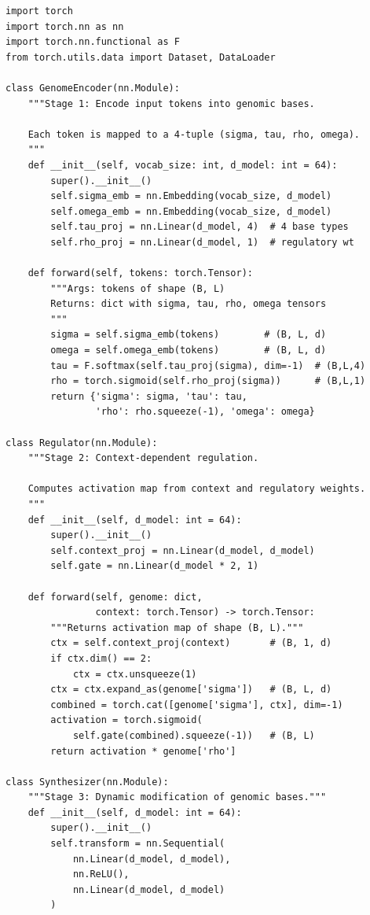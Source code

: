 \begin{lstlisting}[style=dogmapython, caption={Lab 6: DOGMA pipeline stages as PyTorch modules.}]
import torch
import torch.nn as nn
import torch.nn.functional as F
from torch.utils.data import Dataset, DataLoader

class GenomeEncoder(nn.Module):
    """Stage 1: Encode input tokens into genomic bases.

    Each token is mapped to a 4-tuple (sigma, tau, rho, omega).
    """
    def __init__(self, vocab_size: int, d_model: int = 64):
        super().__init__()
        self.sigma_emb = nn.Embedding(vocab_size, d_model)
        self.omega_emb = nn.Embedding(vocab_size, d_model)
        self.tau_proj = nn.Linear(d_model, 4)  # 4 base types
        self.rho_proj = nn.Linear(d_model, 1)  # regulatory wt

    def forward(self, tokens: torch.Tensor):
        """Args: tokens of shape (B, L)
        Returns: dict with sigma, tau, rho, omega tensors
        """
        sigma = self.sigma_emb(tokens)        # (B, L, d)
        omega = self.omega_emb(tokens)        # (B, L, d)
        tau = F.softmax(self.tau_proj(sigma), dim=-1)  # (B,L,4)
        rho = torch.sigmoid(self.rho_proj(sigma))      # (B,L,1)
        return {'sigma': sigma, 'tau': tau,
                'rho': rho.squeeze(-1), 'omega': omega}

class Regulator(nn.Module):
    """Stage 2: Context-dependent regulation.

    Computes activation map from context and regulatory weights.
    """
    def __init__(self, d_model: int = 64):
        super().__init__()
        self.context_proj = nn.Linear(d_model, d_model)
        self.gate = nn.Linear(d_model * 2, 1)

    def forward(self, genome: dict,
                context: torch.Tensor) -> torch.Tensor:
        """Returns activation map of shape (B, L)."""
        ctx = self.context_proj(context)       # (B, 1, d)
        if ctx.dim() == 2:
            ctx = ctx.unsqueeze(1)
        ctx = ctx.expand_as(genome['sigma'])   # (B, L, d)
        combined = torch.cat([genome['sigma'], ctx], dim=-1)
        activation = torch.sigmoid(
            self.gate(combined).squeeze(-1))   # (B, L)
        return activation * genome['rho']

class Synthesizer(nn.Module):
    """Stage 3: Dynamic modification of genomic bases."""
    def __init__(self, d_model: int = 64):
        super().__init__()
        self.transform = nn.Sequential(
            nn.Linear(d_model, d_model),
            nn.ReLU(),
            nn.Linear(d_model, d_model)
        )


\end{lstlisting}
